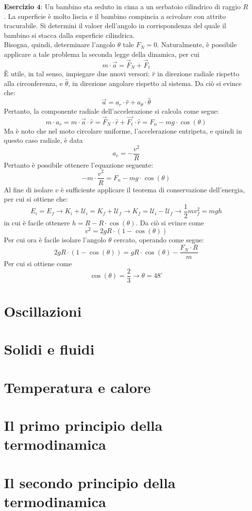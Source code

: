 \documentclass[a4paper]{extarticle}
\begin{document}
\vspace{1em}
\noindent
\textbf{Esercizio $\boldsymbol{4}$}: Un bambino sta seduto in cima a un serbatoio cilindrico di raggio $R$. La superficie è molto liscia e il bambino compincia a scivolare con attrito tracurabile. Si determini il valoer dell'angolo in corrispondenza del quale il bambino si stacca dalla superficie cilindrica.\\
Bisogna, quindi, determinare l'angolo $\theta$ tale $F_N=0$. Naturalmente, è possibile applicare a tale problema la seconda legge della dinamica, per cui
\[m \cdot \vec a = \vec F_N + \vec F_t\]
È utile, in tal senso, impiegare due nuovi versori: $\hat r$ in direzione radiale rispetto alla circonferenza, e $\hat \theta$, in direzione angolare rispetto al sistema. Da ciò si evince che:
\[\vec a = a_r \cdot \hat{r} + a_\theta \cdot \hat{\theta}\]
Pertanto, la componente radiale dell'accelerazione si calcola come segue:
\[m \cdot a_r = m \cdot \vec a \cdot \hat{r} = \vec F_N \cdot \hat{r} + \vec{F_t} \cdot \hat{r} = F_n - mg \cdot \cos(\theta)\]
Ma è noto che nel moto circolare uniforme, l'accelerazione entripeta, e quindi in questo caso radiale, è data
\[a_r = - \frac{v^2}{R}\]
Pertanto è possibile ottenere l'equazione seguente:
\[-m \cdot \frac{v^2}{R} = F_n - mg \cdot \cos(\theta)\]
Al fine di isolare $v$ è sufficiente applicare il teorema di conservazione dell'energia, per cui si ottiene che:
\[E_i = E_f \longrightarrow K_i + \mathcal{U}_{i} = K_f + \mathcal{U}_f \longrightarrow K_f = \mathcal{U}_i - \mathcal{U}_f \longrightarrow \frac{1}{2}mv_f^2 = mgh\]
in cui è facile ottenere $h=R-R \cdot \cos(\theta)$. Da ciò si evince come
\[v^2 = 2g R \cdot (1-\cos(\theta))\]
Per cui ora è facile isolare l'angolo $\theta$ cercato, operando come segue:
\[2g R \cdot (1-\cos(\theta))=gR \cdot \cos(\theta) - \frac{F_N \cdot R}{m}\]
Per cui si ottiene come
\[\cos(\theta) = \frac{2}{3} \longrightarrow \theta=48^\circ\]




\newpage
\section{Oscillazioni}

\newpage
\section{Solidi e fluidi}

\newpage
\section{Temperatura e calore}

\newpage
\section{Il primo principio della termodinamica}

\newpage
\section{Il secondo principio della termodinamica}
\end{document}
